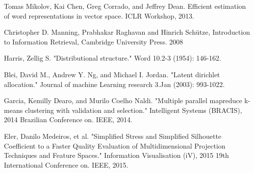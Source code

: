 \documentclass[
	11pt, %
	a4paper, %
	oneside, %
	headinclude,footinclude, %
	BCOR5mm, %
]{scrartcl}
\begin{document}
\begin{thebibliography}{12}

    Tomas Mikolov, Kai Chen, Greg Corrado, and Jeffrey Dean. Efficient estimation of word representations
    in vector space. ICLR Workshop, 2013.

	Christopher D. Manning, Prabhakar Raghavan and Hinrich Schütze, Introduction to Information Retrieval, Cambridge University Press. 2008

	Harris, Zellig S. "Distributional structure." Word 10.2-3 (1954): 146-162.

	Blei, David M., Andrew Y. Ng, and Michael I. Jordan. "Latent dirichlet allocation." Journal of machine Learning research 3.Jan (2003): 993-1022.

	Garcia, Kemilly Dearo, and Murilo Coelho Naldi. "Multiple parallel mapreduce k-means clustering with validation and selection." Intelligent Systems (BRACIS), 2014 Brazilian Conference on. IEEE, 2014.

	Eler, Danilo Medeiros, et al. "Simplified Stress and Simplified Silhouette Coefficient to a Faster Quality Evaluation of Multidimensional Projection Techniques and Feature Spaces." Information Visualisation (iV), 2015 19th International Conference on. IEEE, 2015.

\end{thebibliography}

\end{document}
